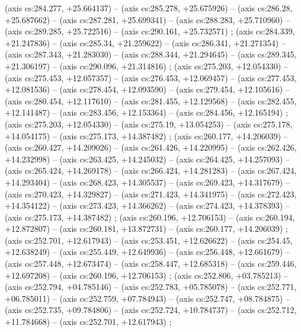     (axis cs:284.277,    +25.664137) --  (axis cs:285.278,    +25.675926) --  (axis cs:286.28,    +25.687662) --  (axis cs:287.281,    +25.699341) --  (axis cs:288.283,    +25.710960) --  (axis cs:289.285,    +25.722516) --  (axis cs:290.161,    +25.732571) ;
    (axis cs:284.339,    +21.247836) --  (axis cs:285.34,    +21.259622) --  (axis cs:286.341,    +21.271354) --  (axis cs:287.343,    +21.283030) --  (axis cs:288.344,    +21.294645) --  (axis cs:289.345,    +21.306197) --  (axis cs:290.096,    +21.314816) ;
    (axis cs:275.203,    +12.054330) --  (axis cs:275.453,    +12.057357) --  (axis cs:276.453,    +12.069457) --  (axis cs:277.453,    +12.081536) --  (axis cs:278.454,    +12.093590) --  (axis cs:279.454,    +12.105616) --  (axis cs:280.454,    +12.117610) --  (axis cs:281.455,    +12.129568) --  (axis cs:282.455,    +12.141487) --  (axis cs:283.456,    +12.153364) --  (axis cs:284.456,    +12.165194) ;
    (axis cs:275.203,    +12.054330) --  (axis cs:275.19,    +13.054253) --  (axis cs:275.178,    +14.054175) --  (axis cs:275.173,    +14.387482) ;
    (axis cs:260.177,    +14.206039) --  (axis cs:260.427,    +14.209026) --  (axis cs:261.426,    +14.220995) --  (axis cs:262.426,    +14.232998) --  (axis cs:263.425,    +14.245032) --  (axis cs:264.425,    +14.257093) --  (axis cs:265.424,    +14.269178) --  (axis cs:266.424,    +14.281283) --  (axis cs:267.424,    +14.293404) --  (axis cs:268.423,    +14.305537) --  (axis cs:269.423,    +14.317679) --  (axis cs:270.423,    +14.329827) --  (axis cs:271.423,    +14.341975) --  (axis cs:272.423,    +14.354122) --  (axis cs:273.423,    +14.366262) --  (axis cs:274.423,    +14.378393) --  (axis cs:275.173,    +14.387482) ;
    (axis cs:260.196,    +12.706153) --  (axis cs:260.194,    +12.872807) --  (axis cs:260.181,    +13.872731) --  (axis cs:260.177,    +14.206039) ;
    (axis cs:252.701,    +12.617943) --  (axis cs:253.451,    +12.626622) --  (axis cs:254.45,    +12.638249) --  (axis cs:255.449,    +12.649936) --  (axis cs:256.448,    +12.661679) --  (axis cs:257.448,    +12.673474) --  (axis cs:258.447,    +12.685318) --  (axis cs:259.446,    +12.697208) --  (axis cs:260.196,    +12.706153) ;
    (axis cs:252.806,    +03.785213) --  (axis cs:252.794,    +04.785146) --  (axis cs:252.783,    +05.785078) --  (axis cs:252.771,    +06.785011) --  (axis cs:252.759,    +07.784943) --  (axis cs:252.747,    +08.784875) --  (axis cs:252.735,    +09.784806) --  (axis cs:252.724,    +10.784737) --  (axis cs:252.712,    +11.784668) --  (axis cs:252.701,    +12.617943) ;
